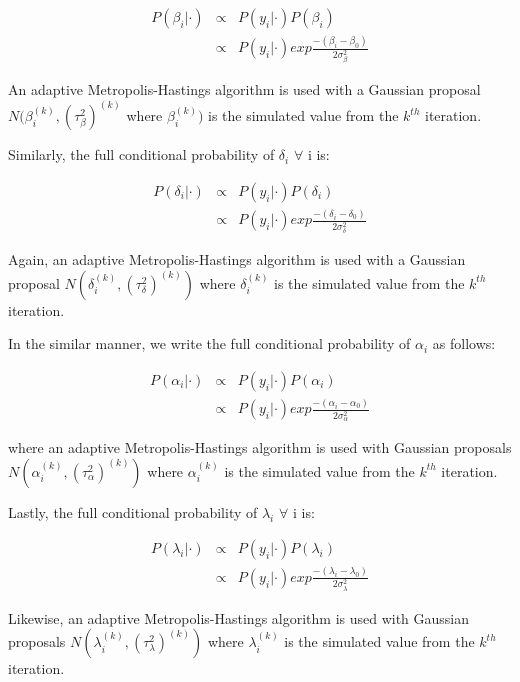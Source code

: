 \documentclass[twoside,onecolumn]{article}
\begin{document}
$$
\begin{array}{rcl}
P(\beta_i | \cdot) &\propto& P(y_i | \cdot) P(\beta_i) \\
&\propto& P(y_i | \cdot) exp{\frac{-(\beta_i-\beta_0)}{2\sigma_{\beta}^2}}
\end{array}
$$

An adaptive Metropolis-Hastings algorithm is used with a Gaussian proposal $N(\beta_i^{(k)}, (\tau_{\beta}^2)^{(k)}$ where $\beta_i^{(k)})$ is the simulated value from the $k^{th}$ iteration.

Similarly, the full conditional probability of $\delta_i$ $\forall$ i is:

$$
\begin{array}{rcl}
P(\delta_i | \cdot) &\propto& P(y_i | \cdot) P(\delta_i) \\
&\propto& P(y_i | \cdot) exp{\frac{-(\delta_i-\delta_0)}{2\sigma_{\delta}^2}}
\end{array}
$$

Again, an adaptive Metropolis-Hastings algorithm is used with a Gaussian proposal $N(\delta_i^{(k)}, (\tau_{\delta}^2)^{(k)})$ where $\delta_i^{(k)}$ is the simulated value from the $k^{th}$ iteration.

In the similar manner, we write the full conditional probability of $\alpha_i$ as follows:

$$
\begin{array}{rcl}
P(\alpha_i | \cdot) &\propto& P(y_i | \cdot) P(\alpha_i) \\
&\propto& P(y_i | \cdot) exp{\frac{-(\alpha_i-\alpha_0)}{2\sigma_{\alpha}^2}}
\end{array}
$$

where an adaptive Metropolis-Hastings algorithm is used with Gaussian proposals $N(\alpha_i^{(k)}, (\tau_{\alpha}^2)^{(k)})$ where $\alpha_i^{(k)}$ is the simulated value from the $k^{th}$ iteration.

Lastly, the full conditional probability of $\lambda_i$ $\forall$ i is:

$$
\begin{array}{rcl}
P(\lambda_i | \cdot) &\propto& P(y_i | \cdot) P(\lambda_i) \\
&\propto& P(y_i | \cdot) exp{\frac{-(\lambda_i-\lambda_0)}{2\sigma_{\lambda}^2}}
\end{array}
$$

Likewise, an adaptive Metropolis-Hastings algorithm is used with Gaussian proposals $N(\lambda_i^{(k)}, (\tau_{\lambda}^2)^{(k)})$ where $\lambda_i^{(k)}$ is the simulated value from the $k^{th}$ iteration. 
\end{document}
